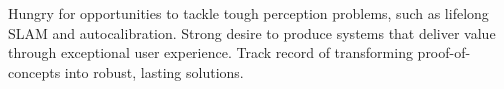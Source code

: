 

\begin{cvparagraph}

Hungry for opportunities to tackle tough perception problems, such as lifelong
SLAM and autocalibration. Strong desire to produce systems that deliver
value through exceptional user experience. Track record of transforming
proof-of-concepts into robust, lasting solutions.
\end{cvparagraph}
